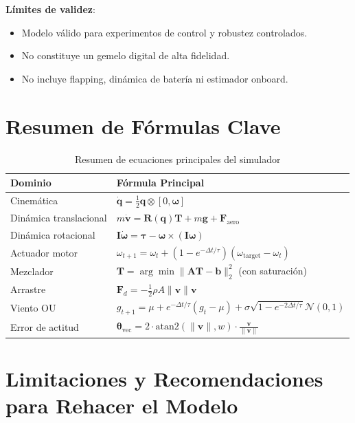 \documentclass[12pt,a4paper]{article}
\begin{document}
\textbf{Límites de validez}:
\begin{itemize}
    \item Modelo válido para experimentos de control y robustez controlados.
    \item No constituye un gemelo digital de alta fidelidad.
    \item No incluye flapping, dinámica de batería ni estimador onboard.
\end{itemize}

\section{Resumen de Fórmulas Clave}

\begin{table}[h]
\centering
\begin{tabular}{@{}ll@{}}
\toprule
\textbf{Dominio} & \textbf{Fórmula Principal} \\
\midrule
Cinemática & $\dot{\mathbf{q}} = \frac12 \mathbf{q} \otimes [0, \boldsymbol{\omega}]$ \\
Dinámica translacional & $m \dot{\mathbf{v}} = \mathbf{R}(\mathbf{q})\mathbf{T} + m\mathbf{g} + \mathbf{F}_{\text{aero}}$ \\
Dinámica rotacional & $\mathbf{I} \dot{\boldsymbol{\omega}} = \boldsymbol{\tau} - \boldsymbol{\omega} \times (\mathbf{I}\boldsymbol{\omega})$ \\
Actuador motor & $\omega_{t+1} = \omega_t + (1-e^{-\Delta t/\tau})(\omega_{\text{target}}-\omega_t)$ \\
Mezclador & $\mathbf{T} = \arg\min \|\mathbf{A}\mathbf{T} - \mathbf{b}\|_2^2$ (con saturación) \\
Arrastre & $\mathbf{F}_d = -\frac12\rho A \|\mathbf{v}\| \mathbf{v}$ \\
Viento OU & $g_{t+1} = \mu + e^{-\Delta t/\tau}(g_t-\mu) + \sigma\sqrt{1-e^{-2\Delta t/\tau}}\mathcal{N}(0,1)$ \\
Error de actitud & $\boldsymbol{\theta}_{\text{vec}} = 2 \cdot \text{atan2}(\|\mathbf{v}\|,w) \cdot \frac{\mathbf{v}}{\|\mathbf{v}\|}$ \\
\bottomrule
\end{tabular}
\caption{Resumen de ecuaciones principales del simulador}
\end{table}

\section{Limitaciones y Recomendaciones para Rehacer el Modelo}
\end{document}
